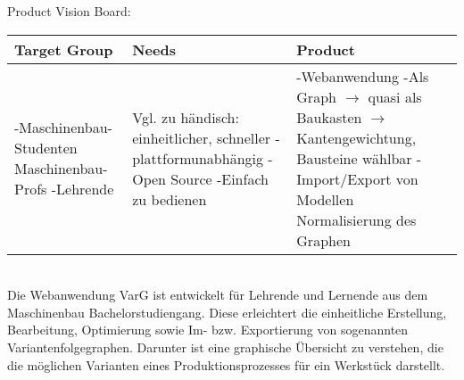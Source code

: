 \documentclass[twoside]{report}
\begin{document}
\noindent Product Vision Board: \\
\begin{tabular}{|p{50mm}|p{50mm}|p{50mm}|}
  \hline
  \textbf{Target Group}                                                  & \textbf{Needs}                                                                                                                        & \textbf{Product}                                                                                                                                                                                                 \\
  \hline
  -Maschinenbau-Studenten \newline Maschinenbau-Profs \newline -Lehrende & Vgl. zu händisch: \newline einheitlicher, schneller \newline -plattformunabhängig \newline -Open Source \newline -Einfach zu bedienen & -Webanwendung \newline -Als Graph \newline $\rightarrow$ quasi als Baukasten \newline $\rightarrow$ Kantengewichtung, Bausteine wählbar \newline -Import/Export von Modellen \newline Normalisierung des Graphen \\
  \hline
\end{tabular}
\\

\noindent Die Webanwendung VarG ist entwickelt für Lehrende und Lernende aus dem Maschinenbau Bachelorstudiengang.
Diese erleichtert die einheitliche Erstellung, Bearbeitung, Optimierung sowie Im- bzw. Exportierung von sogenannten Variantenfolgegraphen. Darunter ist eine graphische Übersicht zu verstehen, die die möglichen Varianten eines Produktionsprozesses für ein Werkstück darstellt.




\end{document}
